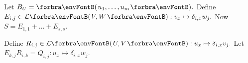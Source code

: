 Let $B_U=\Par{u_1,\dots,u_m}.$ Define $E_{i,j}\in\Lm{V,W}:v_x\mapsto\delta_{i,x}w_j.$ Now $S=E_{1,1}+\dots+E_{s,s}.$\par\vspace{0pt}\quad%
Define $R_{i,j}\in\Lm{U,V}:u_x\mapsto\delta_{i,x}v_j.$ \;Let $E_{k,j}R_{i,k}=Q_{i,j}:u_x\mapsto\delta_{i,x}w_j.$\par\vspace{-20pt}\quad
